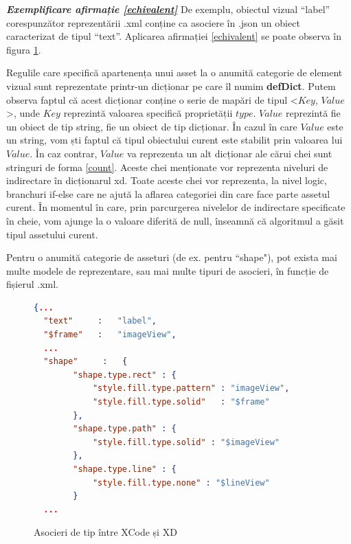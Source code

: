 \textbf{\textit{Exemplificare afirmație \ref{echivalent}}} De exemplu, obiectul vizual “label” corespunzător reprezentării .xml conține ca asociere în .json un obiect caracterizat de tipul “text”. Aplicarea afirmației \ref{echivalent} se poate observa în figura \ref{fig:XD2XCode Defs}. 

Regulile care specifică apartenența unui asset la o anumită categorie de element vizual sunt reprezentate printr-un dicționar pe care îl numim \textbf{defDict}. Putem observa faptul că acest dicționar conține o serie de mapări de tipul <$Key$, $Value$>, unde $Key$ reprezintă valoarea specifică proprietății $type$. $Value$ reprezintă fie un obiect de tip string, fie un obiect de tip dicționar. În cazul în care $Value$ este un string, vom ști faptul că tipul obiectului curent este stabilit prin valoarea lui $Value$. În caz contrar, $Value$ va reprezenta un alt dicționar ale cărui chei sunt stringuri de forma \ref{count}. Aceste chei menționate vor reprezenta niveluri de indirectare în dicționarul xd. Toate aceste chei vor reprezenta, la nivel logic, branchuri if-else care ne ajută la aflarea categoriei din care face parte assetul curent. În momentul în care, prin parcurgerea nivelelor de indirectare specificate în cheie, vom ajunge la o valoare diferită de null, înseamnă că algoritmul a găsit tipul assetului curent.\\

\begin{myNote}\label{tip similar}

Pentru o anumită categorie de asseturi (de ex. pentru ``shape"), pot exista mai multe modele de reprezentare, sau mai multe tipuri de asocieri, în funcție de fișierul .xml.
\end{myNote}

\begin{figure}[!htbp]
\begin{lstlisting}[language=json,firstnumber=1]
  {...
  "text"     :   "label",
  "$frame"   :   "imageView",
  ...
  "shape"     :   {
        "shape.type.rect" : {
            "style.fill.type.pattern" : "imageView",
            "style.fill.type.solid"   : "$frame"
        },
        "shape.type.path" : {
            "style.fill.type.solid" : "$imageView"
        },
        "shape.type.line" : {
            "style.fill.type.none" : "$lineView"
        }
  ...
\end{lstlisting}
\caption{Asocieri de tip între XCode și XD} \label{fig:XD2XCode Defs}
\end{figure}

